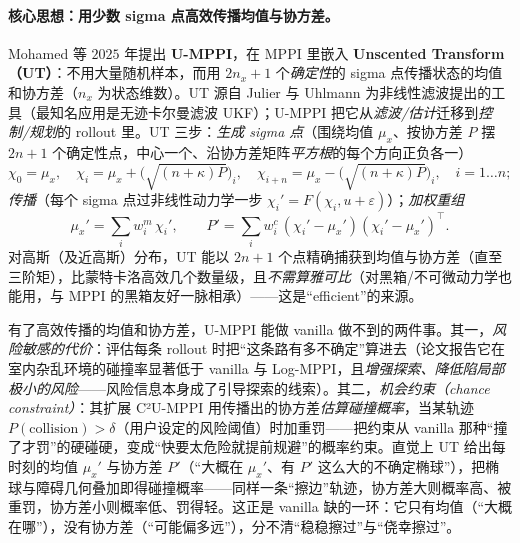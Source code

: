 \paragraph{核心思想：用少数 sigma 点高效传播均值与协方差。}
Mohamed 等 $2025$ 年提出 \textbf{U-MPPI}\cite{mohamed2025umppi}，在 MPPI 里嵌入 \textbf{Unscented Transform（UT）}：不用大量随机样本，而用 $2n_x+1$ 个\emph{确定性}的 sigma 点传播状态的均值和协方差（$n_x$ 为状态维数）。UT 源自 Julier 与 Uhlmann 为非线性滤波提出的工具（最知名应用是无迹卡尔曼滤波 UKF\cite{julier1997unscented}）；U-MPPI 把它从\emph{滤波/估计}迁移到\emph{控制/规划}的 rollout 里。UT 三步：\emph{生成 sigma 点}（围绕均值 $\mu_x$、按协方差 $P$ 摆 $2n+1$ 个确定性点，中心一个、沿协方差矩阵\emph{平方根}的每个方向正负各一）
\begin{equation}
  \chi_0=\mu_x,\quad \chi_i=\mu_x+\big(\sqrt{(n{+}\kappa)P}\big)_i,\quad \chi_{i+n}=\mu_x-\big(\sqrt{(n{+}\kappa)P}\big)_i,\quad i=1\dots n;
  \label{eq:mv-sigma}
\end{equation}
\emph{传播}（每个 sigma 点过非线性动力学一步 $\chi_i'=F(\chi_i,u+\varepsilon)$）；\emph{加权重组}
\begin{equation}
  \mu_x'=\sum_i w_i^m\,\chi_i',\qquad P'=\sum_i w_i^c\,(\chi_i'-\mu_x')(\chi_i'-\mu_x')^\top.
  \label{eq:mv-ut-recombine}
\end{equation}
对高斯（及近高斯）分布，UT 能以 $2n+1$ 个点精确捕获到均值与协方差（直至三阶矩），比蒙特卡洛高效几个数量级，且\emph{不需算雅可比}（对黑箱/不可微动力学也能用，与 MPPI 的黑箱友好一脉相承）——这是“efficient”的来源。

\begin{insight}
有了高效传播的均值和协方差，U-MPPI 能做 vanilla 做不到的两件事。其一，\emph{风险敏感的代价}：评估每条 rollout 时把“这条路有多不确定”算进去（论文报告它在室内杂乱环境的碰撞率显著低于 vanilla 与 Log-MPPI，且\emph{增强探索、降低陷局部极小的风险}——风险信息本身成了引导探索的线索）。其二，\emph{机会约束（chance constraint）}：其扩展 C²U-MPPI 用传播出的协方差\emph{估算碰撞概率}，当某轨迹 $P(\text{collision})>\delta$（用户设定的风险阈值）时加重罚——把约束从 vanilla 那种“撞了才罚”的硬碰硬，变成“快要太危险就提前规避”的概率约束。直觉上 UT 给出每时刻的均值 $\mu_x'$ 与协方差 $P'$（“大概在 $\mu_x'$、有 $P'$ 这么大的不确定椭球”），把椭球与障碍几何叠加即得碰撞概率——同样一条“擦边”轨迹，协方差大则概率高、被重罚，协方差小则概率低、罚得轻。这正是 vanilla 缺的一环：它只有均值（“大概在哪”），没有协方差（“可能偏多远”），分不清“稳稳擦过”与“侥幸擦过”。
\end{insight}

